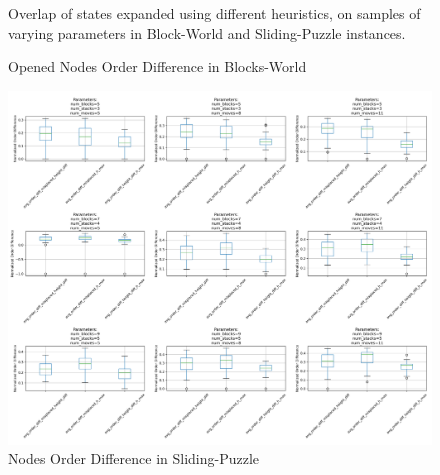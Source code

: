 \documentclass[letterpaper]{article}
\begin{document}
\begin{figure}[ht]
\begin{minipage}{0.39\textwidth}
    \end{minipage}
    \caption{Overlap of states expanded using different heuristics, on samples of varying parameters in Block-World and Sliding-Puzzle instances.}
    \label{fig:heuristic-overlap}
\end{figure}

\begin{figure}[ht]
    \centering
    \begin{minipage}{0.57\textwidth} %
        \centering
        \caption*{Opened Nodes Order Difference in Blocks-World}
        \includegraphics[width=\textwidth]{plots/blocks_world_order_differences_2.png}
    \end{minipage}%
    \hfill
    \begin{minipage}{0.39\textwidth} %
        \centering
        \caption*{Nodes Order Difference in Sliding-Puzzle}

\end{minipage}
\end{figure}
\end{document}
